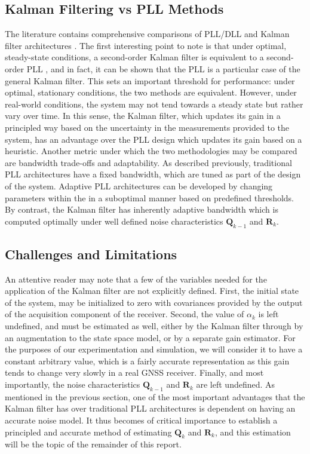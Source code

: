 \documentclass[11pt]{article}
\begin{document}
\subsection{Kalman Filtering vs PLL Methods}

The literature contains comprehensive comparisons of PLL/DLL and Kalman filter architectures \cite{vila2017plls}. The first interesting point to note is that under optimal, steady-state conditions, a second-order Kalman filter is equivalent to a second-order PLL \cite{Pata-99}, and in fact, it can be shown that the PLL is a particular case of the general Kalman filter. This sets an important threshold for performance: under optimal, stationary conditions, the two methods are equivalent. However, under real-world conditions, the system may not tend towards a steady state but rather vary over time. In this sense, the Kalman filter, which updates its gain in a principled way based on the uncertainty in the measurements provided to the system, has an advantage over the PLL design which updates its gain based on a heuristic. Another metric under which the two methodologies may be compared are bandwidth trade-offs and adaptability. As described previously, traditional PLL architectures have a fixed bandwidth, which are tuned as part of the design of the system. Adaptive PLL architectures can be developed by changing parameters within the in a suboptimal manner based on predefined thresholds. By contrast, the Kalman filter has inherently adaptive bandwidth which is computed optimally under well defined noise characteristics $\mathbf{Q}_{k-1}$ and $\mathbf{R}_k$.

\subsection{Challenges and Limitations}

An attentive reader may note that a few of the variables needed for the application of the Kalman filter are not explicitly defined. First, the initial state of the system, may be initialized to zero with covariances provided by the output of the acquisition component of the receiver. Second, the value of $\alpha_k$ is left undefined, and must be estimated as well, either by the Kalman filter through by an augmentation to the state space model, or by a separate gain estimator. For the purposes of our experimentation and simulation, we will consider it to have a constant arbitrary value, which is a fairly accurate representation as this gain tends to change very slowly in a real GNSS receiver. Finally, and most importantly, the noise characteristics $\mathbf{Q}_{k-1}$ and $\mathbf{R}_k$ are left undefined. As mentioned in the previous section, one of the most important advantages that the Kalman filter has over traditional PLL architectures is dependent on having an accurate noise model. It thus becomes of critical importance to establish a principled and accurate method of estimating $\mathbf{Q}_k$ and $\mathbf{R}_k$, and this estimation will be the topic of the remainder of this report.
\end{document}
